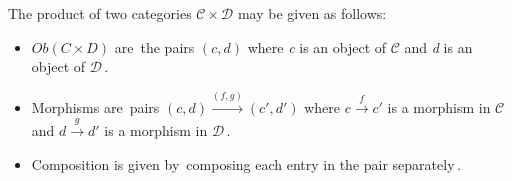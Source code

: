 The product of two categories $\mathcal{C}\times \mathcal{D}$ may be given as follows:
\begin{itemize}
  \item $Ob(C\times D)$ are \,the pairs $(c,d)$ where \emph{c} is an object of $\mathcal{C}$ and \emph{d} is an object of $\mathcal{D}$\,.
  \item Morphisms are \,pairs $(c,d)\xrightarrow{(f,g)}(c',d')$ where $c \xrightarrow{f}c'$ is a morphism in $\mathcal{C}$ and $d \xrightarrow{g}d'$ is a morphism in $\mathcal{D}$\,.
  \item Composition is given by \,composing each entry in the pair separately\,.
\end{itemize}